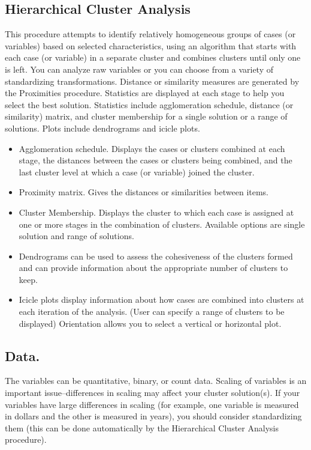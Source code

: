 \documentclass[a4paper,12pt]{article}
\begin{document}
\subsection*{Hierarchical Cluster Analysis}
This procedure attempts to identify relatively homogeneous groups of cases (or variables) based on selected characteristics, using an algorithm that starts with each case (or variable) in a separate cluster and combines clusters until only one is left. You can analyze raw variables or you can choose from a variety of standardizing transformations. Distance or similarity measures are generated by the Proximities procedure. Statistics are displayed at each stage to help you select the best solution.  Statistics include agglomeration schedule, distance (or similarity) matrix, and cluster membership for a single solution or a range of solutions.  Plots include dendrograms and icicle plots.
\begin{itemize}
\item 	Agglomeration schedule. Displays the cases or clusters combined at each stage, the distances between the cases or clusters being combined, and the last cluster level at which a case (or variable) joined the cluster.
\item 	Proximity matrix. Gives the distances or similarities between items.
\item 	Cluster Membership. Displays the cluster to which each case is assigned at one or more stages in the combination of clusters. Available options are single solution and range of solutions.
\item 	Dendrograms can be used to assess the cohesiveness of the clusters formed and can provide information about the appropriate number of clusters to keep.
\item 	Icicle plots display information about how cases are combined into clusters at each iteration of the analysis. (User can specify a range of clusters to be displayed) Orientation allows you to select a vertical or horizontal plot.
\end{itemize}
\subsection*{Data.}  The variables can be quantitative, binary, or count data. Scaling of variables is an important issue--differences in scaling may affect your cluster solution(s). If your variables have large differences in scaling (for example, one variable is measured in dollars and the other is measured in years), you should consider standardizing them (this can be done automatically by the Hierarchical Cluster Analysis procedure).
\end{document}
